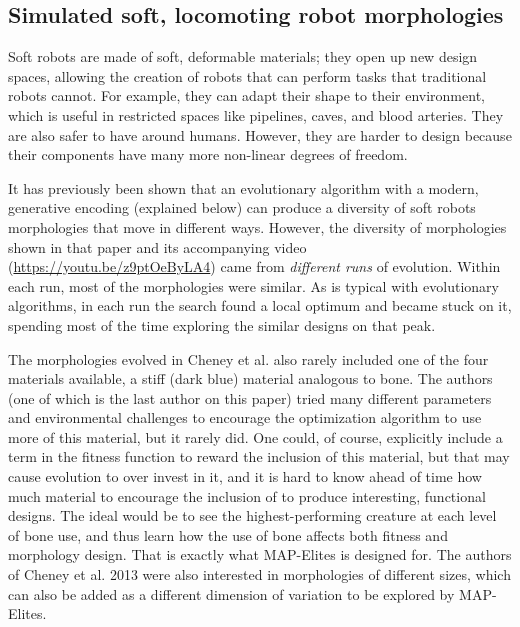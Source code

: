 \documentclass[twocolumn, DIV25, 9pt]{scrartcl}
\newcommand{\todoOfficialVersion}[1]{} %
\begin{document}
\begin{figure*}[ht!]
{        \todoOfficialVersion{I think the right figure is unreadable. Can we try a few different things? Options: (1) Different color per path, with a circle at the beginning and an arrow at the end. (2) Different color per path, but different shades of that color (lighter to darker) to indicate the start-to-finish of the lineage. (3) One path per panel, 4 panels?}
     }%
     \todoOfficialVersion{Add heatmap}
       \label{fig:retina_paths}
\end{figure*}


\subsection{Simulated soft, locomoting robot morphologies}

Soft robots are made of soft, deformable materials; they open up new design spaces, allowing the creation of robots that can perform tasks that traditional robots cannot\cite{trivedi2008soft, ilievski2011,lipson2014challenges, laschi2012}. For example, they can adapt their shape to their environment, which is useful in restricted spaces like pipelines, caves, and blood arteries. They are also safer to have around humans\cite{bicchi2004}. However, they are harder to design because their components have many more non-linear degrees of freedom\cite{Hiller2012, lipson2014challenges}. 

 

It has previously been shown that an evolutionary algorithm with a modern, generative encoding (explained below) can produce a diversity of soft robots morphologies that move in different ways\cite{cheney2013unshackling}. However, the diversity of morphologies shown in that paper and its accompanying video (\url{https://youtu.be/z9ptOeByLA4}) came from \emph{different runs} of evolution. Within each run, most of the morphologies were similar. As is typical with evolutionary algorithms, in each run the search found a local optimum and became stuck on it, spending most of the time exploring the similar designs on that peak. 

The morphologies evolved in Cheney et al.\cite{cheney2013unshackling} also rarely included one of the four materials available, a stiff (dark blue) material analogous to bone. The authors (one of which is the last author on this paper) tried many different parameters and environmental challenges to encourage the optimization algorithm to use more of this material, but it rarely did. One could, of course, explicitly include a term in the fitness function to reward the inclusion of this material, but that may cause evolution to over invest in it, and it is hard to know ahead of time how much material to encourage the inclusion of to produce interesting, functional designs. The ideal would be to see the highest-performing creature at each level of bone use, and thus learn how the use of bone affects both fitness and morphology design. That is exactly what MAP-Elites is designed for. The authors of Cheney et al. 2013 were also interested in morphologies of different sizes, which can also be added as a different dimension of variation to be explored by MAP-Elites. 
\end{document}
